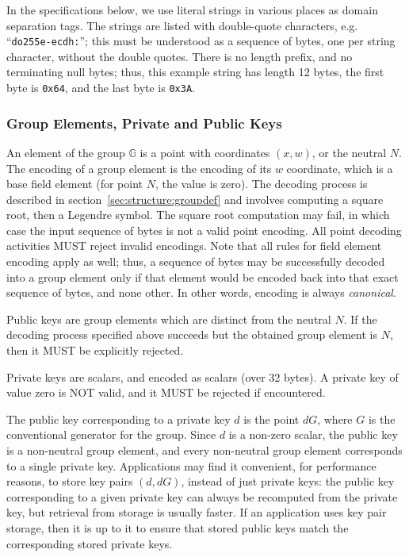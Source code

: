 \documentclass{llncs}
\newcommand{\bG}{\mathbb{G}}
\begin{document}
In the specifications below, we use literal strings in various places as
domain separation tags. The strings are listed with double-quote
characters, e.g. ``\verb+do255e-ecdh:+''; this must be understood as a
sequence of bytes, one per string character, without the double quotes.
There is no length prefix, and no terminating null bytes; thus, this
example string has length 12 bytes, the first byte is \verb+0x64+, and
the last byte is \verb+0x3A+.

\subsubsection{Group Elements, Private and Public Keys}

An element of the group $\bG$ is a point with coordinates $(x, w)$, or
the neutral $N$. The encoding of a group element is the encoding of its
$w$ coordinate, which is a base field element (for point $N$, the value
is zero). The decoding process is described in
section~\ref{sec:structure:groupdef} and involves computing a square
root, then a Legendre symbol. The square root computation may fail, in
which case the input sequence of bytes is not a valid point encoding.
All point decoding activities MUST reject invalid encodings. Note that
all rules for field element encoding apply as well; thus, a sequence of
bytes may be successfully decoded into a group element only if that
element would be encoded back into that exact sequence of bytes, and
none other. In other words, encoding is always \emph{canonical}.

Public keys are group elements which are distinct from the neutral $N$.
If the decoding process specified above succeeds but the obtained group
element is $N$, then it MUST be explicitly rejected.

Private keys are scalars, and encoded as scalars (over 32 bytes). A
private key of value zero is NOT valid, and it MUST be rejected if
encountered.

The public key corresponding to a private key $d$ is the point $dG$,
where $G$ is the conventional generator for the group. Since $d$ is a
non-zero scalar, the public key is a non-neutral group element, and
every non-neutral group element corresponds to a single private key.
Applications may find it convenient, for performance reasons, to store
key pairs $(d, dG)$, instead of just private keys: the public key
corresponding to a given private key can always be recomputed from the
private key, but retrieval from storage is usually faster. If an
application uses key pair storage, then it is up to it to ensure that
stored public keys match the corresponding stored private keys.
\end{document}
